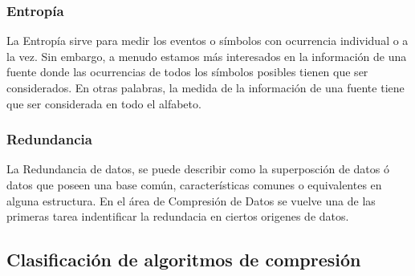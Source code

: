 \subsubsection{Entropía}\label{ch2:concept-entropia}

La Entropía sirve para medir los eventos o símbolos con ocurrencia individual o a la vez. Sin embargo, a menudo estamos más interesados en la información de una fuente donde las ocurrencias de todos los símbolos posibles tienen que ser considerados. En otras palabras, la medida de la información de una fuente tiene que ser considerada en todo el alfabeto.





\subsubsection{Redundancia}\label{ch2:concept-redundacia}

La Redundancia de datos, se puede describir como la superposción de datos ó datos que poseen una base común, características comunes o equivalentes en alguna estructura. En el área de Compresión de Datos se vuelve una de las primeras tarea indentificar la redundacia en ciertos origenes de datos.


 






\uncm
\subsection{Clasificación de algoritmos de compresión} 

